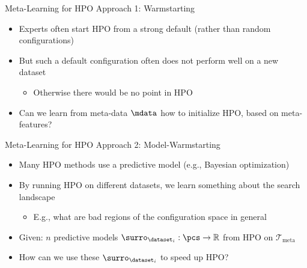 \begin{frame}[c]{Meta-Learning for HPO Approach 1: Warmstarting}
	
\begin{itemize}
	\item Experts often start HPO from a strong default (rather than random configurations)
	\pause
	\medskip
	\item But such a default configuration often does not perform well on a new dataset
	\begin{itemize}
		\item Otherwise there would be no point in HPO
	\end{itemize}
	\pause
	\medskip
	\item Can we learn from meta-data $\mdata$ how to \alert{initialize} HPO, based on meta-features?
\end{itemize}

\end{frame}
\begin{frame}[c]{Meta-Learning for HPO Approach 2: Model-Warmstarting}

\begin{itemize}
	\item Many HPO methods use a predictive model (e.g., Bayesian optimization)
	\medskip
	\item By running HPO on different datasets,
	we learn something about the search landscape
	\begin{itemize}
		\item E.g., what are bad regions of the configuration space in general
	\end{itemize}
	\bigskip
	\pause
	\item Given: $n$ predictive models $\surro_{\dataset_i}: \pcs \to \mathbb{R}$ from HPO on $\mathcal{T}_{\text{meta}}$	
	\item \alert{How can we use these $\surro_{\dataset_i}$ to speed up HPO?}
\end{itemize}


\end{frame}

